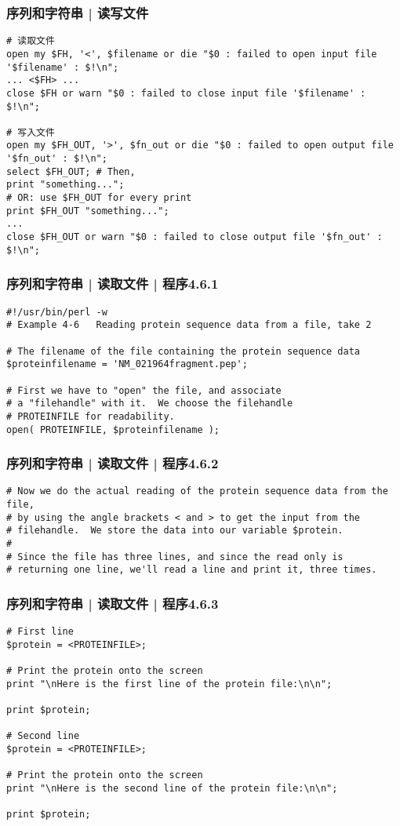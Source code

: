 \begin{frame}[fragile]
  \frametitle{序列和字符串 | \alert{读写文件}}
\begin{lstlisting}[basicstyle=\small\tt]
# 读取文件
open my $FH, '<', $filename or die "$0 : failed to open input file '$filename' : $!\n";
... <$FH> ...
close $FH or warn "$0 : failed to close input file '$filename' : $!\n";

# 写入文件
open my $FH_OUT, '>', $fn_out or die "$0 : failed to open output file '$fn_out' : $!\n";
select $FH_OUT; # Then,
print "something...";
# OR: use $FH_OUT for every print
print $FH_OUT "something...";
... 
close $FH_OUT or warn "$0 : failed to close output file '$fn_out' : $!\n";
\end{lstlisting}
\end{frame}

\begin{frame}[fragile]
  \frametitle{序列和字符串 | 读取文件 | 程序4.6.1}
\begin{lstlisting}
#!/usr/bin/perl -w
# Example 4-6   Reading protein sequence data from a file, take 2

# The filename of the file containing the protein sequence data
$proteinfilename = 'NM_021964fragment.pep';

# First we have to "open" the file, and associate
# a "filehandle" with it.  We choose the filehandle
# PROTEINFILE for readability.
open( PROTEINFILE, $proteinfilename );
\end{lstlisting}
\end{frame}

\begin{frame}[fragile]
  \frametitle{序列和字符串 | 读取文件 | 程序4.6.2}
\begin{lstlisting}[firstnumber=12]
# Now we do the actual reading of the protein sequence data from the file,
# by using the angle brackets < and > to get the input from the
# filehandle.  We store the data into our variable $protein.
#
# Since the file has three lines, and since the read only is
# returning one line, we'll read a line and print it, three times.
\end{lstlisting}
\end{frame}

\begin{frame}[fragile]
  \frametitle{序列和字符串 | 读取文件 | 程序4.6.3}
\begin{lstlisting}[firstnumber=19,basicstyle=\small\tt]
# First line
$protein = <PROTEINFILE>;

# Print the protein onto the screen
print "\nHere is the first line of the protein file:\n\n";

print $protein;

# Second line
$protein = <PROTEINFILE>;

# Print the protein onto the screen
print "\nHere is the second line of the protein file:\n\n";

print $protein;
\end{lstlisting}
\end{frame}

